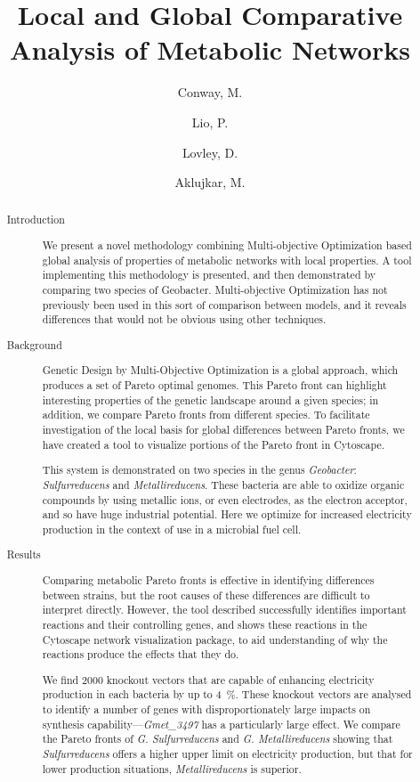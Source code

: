 \documentclass[a4paper,11pt]{article}
\begin{document}
\title{Local and Global Comparative Analysis of Metabolic Networks}
\author{Conway, M. \and Lio, P. \and Lovley, D. \and Aklujkar, M.}
\date{}
\maketitle
\begin{abstract}
{\footnotesize
\begin{description}
\item[]
\item[Introduction] 
We present a novel methodology combining Multi-objective Optimization based global analysis of properties of metabolic networks with local properties. A tool implementing this methodology is presented, and then demonstrated by comparing two species of Geobacter. Multi-objective Optimization has not previously been used in this sort of comparison between models, and it reveals differences that would not be obvious using other techniques.

\item[Background]
Genetic Design by Multi-Objective Optimization is a global approach, which produces a set of Pareto optimal genomes. This Pareto front can highlight interesting properties of the genetic landscape around a given species; in addition, we compare Pareto fronts from different species. To facilitate investigation of the local basis for global  differences between Pareto fronts, we have created a tool to visualize portions of the Pareto front in Cytoscape.

This system is demonstrated on two species in the genus {\it Geobacter}: {\it Sulfurreducens} and {\it Metallireducens}. These bacteria are able to oxidize organic compounds by using metallic ions, or even electrodes, as the electron acceptor, and so have huge industrial potential. Here we optimize for increased electricity production in the context of use in a microbial fuel cell.

\item[Results]
Comparing metabolic Pareto fronts is effective in identifying differences between strains, but the root causes of these differences are difficult to interpret directly. However, the tool described successfully identifies important reactions and their controlling genes, and shows these reactions in the Cytoscape network visualization package, to aid understanding of why the reactions produce the effects that they do.

We find 2000 knockout vectors that are capable of enhancing electricity production in each bacteria by up to \SI{4}{\percent}. These knockout vectors are analysed to identify a number of genes with disproportionately large impacts on synthesis capability---{\it Gmet\_3497} has a particularly large effect. We compare the Pareto fronts of {\it G. Sulfurreducens} and {\it G. Metallireducens} showing that {\it Sulfurreducens} offers a higher upper limit on electricity production, but that for lower production situations, {\it Metallireducens} is superior.
\end{description}
}
\end{abstract}
\pagebreak
\end{document}
